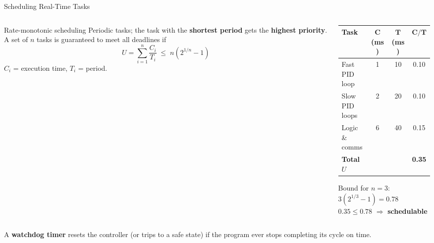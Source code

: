 \documentclass[aspectratio=169]{beamer}
\begin{document}
	\begin{frame}{Scheduling Real-Time Tasks}
		\begin{columns}[T]
			\begin{column}{0.5\textwidth}
				\begin{block}{Rate-monotonic scheduling}
					\small Periodic tasks; the task with the \textbf{shortest period} gets the \textbf{highest priority}. A set of $n$ tasks is guaranteed to meet all deadlines if
					\[
					U = \sum_{i=1}^{n}\frac{C_i}{T_i} \;\le\; n\left(2^{1/n} - 1\right)
					\]
					$C_i$ = execution time, $T_i$ = period.
				\end{block}
			\end{column}
			\begin{column}{0.5\textwidth}
				\renewcommand{\arraystretch}{1.2}
				\centering
				\small
				\begin{tabular}{@{}lccc@{}}
					\toprule
					\textbf{Task} & $\bm{C}$ (ms) & $\bm{T}$ (ms) & $\bm{C/T}$ \\
					\midrule
					Fast PID loop    & 1 & 10 & 0.10 \\
					Slow PID loops   & 2 & 20 & 0.10 \\
					Logic \& comms   & 6 & 40 & 0.15 \\
					\midrule
					\textbf{Total} $U$ & & & \textbf{0.35} \\
					\bottomrule
				\end{tabular}
				\vspace{0.2cm}

				\small Bound for $n = 3$: $3(2^{1/3}-1) = 0.78$\\
				$0.35 \le 0.78$ $\Rightarrow$ \textbf{schedulable} \checkmark
			\end{column}
		\end{columns}
		\vspace{0.1cm}
		\footnotesize\centering A \textbf{watchdog timer} resets the controller (or trips to a safe state) if the program ever stops completing its cycle on time.
	\end{frame}
\end{document}
